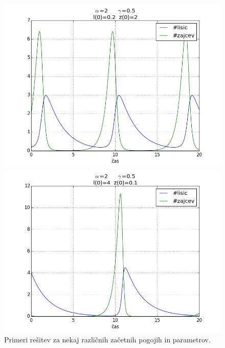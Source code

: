 \documentclass[slovene,11pt,a4paper]{article}
\numberwithin{equation}{section} %
\numberwithin{figure}{section} %
\numberwithin{table}{section} %
\begin{document}
\begin{figure}[h]
{\begin{minipage}[t]{0.5\paperwidth}
\begin{flushleft}

\includegraphics[scale=0.5]{slike/alfa2gama0_5l00_2z02.png}
\hspace{\fill}
\end{flushleft}
\end{minipage}
\begin{minipage}[t]{0.5\paperwidth}
\includegraphics[scale=0.5]{slike/alfa2gama0_5l04z00_1.png}
\end{minipage}%
}
\caption{Primeri rešitev za nekaj različnih začetnih pogojih in parametrov.}
\end{figure}
\end{document}
